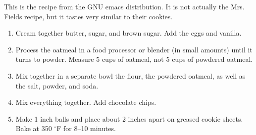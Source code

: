
\begin{ingredients}
\end{ingredients}


\begin{recipe}
  This is the recipe from the GNU emacs distribution.  It is not
  actually the Mrs. Fields recipe, but it tastes very similar to their
  cookies.

  \begin{enumerate}
  \item Cream together butter, sugar, and brown sugar.  Add the eggs and vanilla.

  \item Process the oatmeal in a food processor or blender (in small
  amounts) until it turns to powder.  Measure 5 cups of oatmeal, not 5
  cups of powdered oatmeal.

  \item Mix together in a separate bowl the flour, the powdered
    oatmeal, as well as the salt, powder, and soda.

  \item Mix everything together.  Add chocolate chips.

  \item Make 1 inch balls and place about 2 inches apart on greased
  cookie sheets.  Bake at 350 $^\circ$F for 8--10 minutes.

  \end{enumerate}
\end{recipe}

